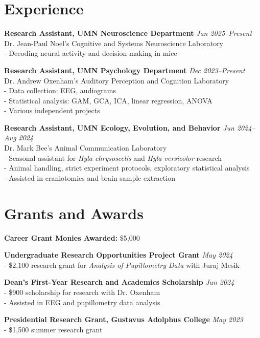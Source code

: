 \documentclass[12pt, a4paper]{article}
\begin{document}
\section*{Experience}
\textbf{Research Assistant, UMN Neuroscience Department} \hfill \textit{Jan 2025--Present} \\
Dr. Jean-Paul Noel's Cognitive and Systems Neuroscience Laboratory \\
- Decoding neural activity and decision-making in mice

\textbf{Research Assistant, UMN Psychology Department} \hfill \textit{Dec 2023--Present} \\
Dr. Andrew Oxenham's Auditory Perception and Cognition Laboratory \\
- Data collection: EEG, audiograms \\
- Statistical analysis: GAM, GCA, ICA, linear regression, ANOVA \\
- Various independent projects  

\textbf{Research Assistant, UMN Ecology, Evolution, and Behavior} \hfill \textit{Jun 2024--Aug 2024} \\
Dr. Mark Bee's Animal Communication Laboratory \\
- Seasonal assistant for \textit{Hyla chrysoscelis} and \textit{Hyla versicolor} research \\
- Animal handling, strict experiment protocols, exploratory statistical analysis \\
- Assisted in craniotomies and brain sample extraction

\section*{Grants and Awards}
\textbf{Career Grant Monies Awarded:} \$5,000

\textbf{Undergraduate Research Opportunities Project Grant} \hfill \textit{May 2024} \\
- \$2,100 research grant for \textit{Analysis of Pupillometry Data} with Juraj Mesik

\textbf{Dean’s First-Year Research and Academics Scholarship} \hfill \textit{Jan 2024} \\
- \$900 scholarship for research with Dr. Oxenham \\
- Assisted in EEG and pupillometry data analysis

\textbf{Presidential Research Grant, Gustavus Adolphus College} \hfill \textit{May 2023} \\
- \$1,500 summer research grant
\end{document}
